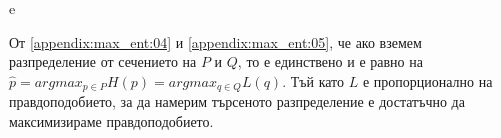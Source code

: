 e\documentclass[main.tex]{subfiles}
\begin{document}
От \autoref{appendix:max_ent:04} и \autoref{appendix:max_ent:05}, че ако вземем разпределение от сечението на $P$ и $Q$, то е единствено и е равно на $\hat{p} = argmax_{p \in P} H(p) = argmax_{q \in Q} L(q)$. Тъй като $L$ е пропорционално на правдоподобието, за да намерим търсеното разпределение е достатъчно да максимизираме правдоподобието.
\end{document}
